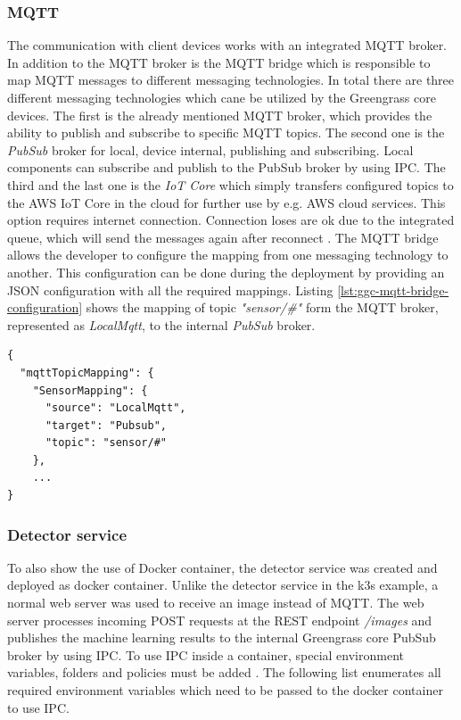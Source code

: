 \subsubsection*{MQTT}
The communication with client devices works with an integrated MQTT broker. In addition to the MQTT broker is the MQTT bridge which is responsible to map MQTT messages to different messaging technologies. In total there are three different messaging technologies which cane be utilized by the Greengrass core devices. The first is the already mentioned MQTT broker, which provides the ability to publish and subscribe to specific MQTT topics. The second one is the \textit{PubSub} broker for local, device internal, publishing and subscribing. Local components can subscribe and publish to the PubSub broker by using \gls{IPC}. The third and the last one is the \textit{IoT Core} which simply transfers configured topics to the AWS IoT Core in the cloud for further use by e.g. \gls{AWS} cloud services. This option requires internet connection. Connection loses are ok due to the integrated queue, which will send the messages again after reconnect \cite{AmazonWebServicesMQTTBridge}. The MQTT bridge allows the developer to configure the mapping from one messaging technology to another. This configuration can be done during the deployment by providing an JSON configuration with all the required mappings. Listing \ref{lst:ggc-mqtt-bridge-configuration} shows the mapping of topic \textit{"sensor/\#"} form the MQTT broker, represented as \textit{LocalMqtt}, to the internal \textit{PubSub} broker.

\begin{lstlisting}[caption={Mapping messages from MQTT topic \textit{"sensor/\#"} to Pubsub broker.},label={lst:ggc-mqtt-bridge-configuration},captionpos=b]
{
  "mqttTopicMapping": {
    "SensorMapping": {
      "source": "LocalMqtt",
      "target": "Pubsub",
      "topic": "sensor/#"
    },
    ...
}
\end{lstlisting}


\subsubsection*{Detector service}
To also show the use of Docker container, the detector service was created and deployed as docker container. Unlike the detector service in the k3s example, a normal web server was used to receive an image instead of MQTT. The web server processes incoming POST requests at the REST endpoint \textit{/images} and publishes the machine learning results to the internal Greengrass core PubSub broker by using \gls{IPC}. To use \gls{IPC} inside a container, special environment variables, folders and policies must be added \cite{AmazonWebServicesDockerContainer}. The following list enumerates all required environment variables which need to be passed to the docker container to use \gls{IPC}.

